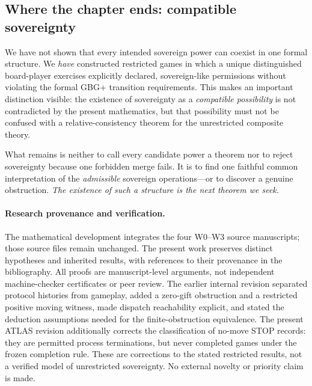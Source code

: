 \documentclass[11pt,letterpaper]{article}
\theoremstyle{definition}\newtheorem{definition}[theorem]{Definition}\newtheorem{example}[theorem]{Example}
\theoremstyle{remark}\newtheorem{remark}[theorem]{Remark}
\begin{document}
\subsection{Where the chapter ends: compatible sovereignty}
We have not shown that every intended sovereign power can coexist in one
formal structure.  We \emph{have} constructed restricted games in which a
unique distinguished board-player exercises explicitly declared,
sovereign-like permissions without violating the formal GBG+ transition
requirements.  This makes an important distinction visible: the existence
of sovereignty as a \emph{compatible possibility} is not contradicted by
the present mathematics, but that possibility must not be confused with a
relative-consistency theorem for the unrestricted composite theory.

What remains is neither to call every candidate power a theorem nor to
reject sovereignty because one forbidden merge fails.  It is to find one
faithful common interpretation of the \emph{admissible} sovereign
operations---or to discover a genuine obstruction.  \emph{The existence of
such a structure is the next theorem we seek.}

\paragraph{Research provenance and verification.}
The mathematical development integrates the four W0--W3 source manuscripts;
those source files remain unchanged. The present work preserves distinct
hypotheses and inherited results, with references to their provenance in the
bibliography. All proofs are manuscript-level arguments, not independent
machine-checker certificates or peer review. The earlier internal revision separated protocol histories from gameplay, added a
zero-gift obstruction and a restricted positive moving witness, made dispatch
reachability explicit, and stated the deduction assumptions needed for the
finite-obstruction equivalence. The present ATLAS revision additionally corrects
the classification of no-move STOP records: they are permitted process
terminations, but never completed games under the frozen completion rule. These
are corrections to the stated restricted results, not a verified model of
unrestricted sovereignty. No external novelty or priority claim is made.
\end{document}
